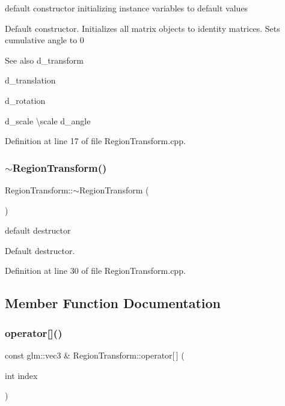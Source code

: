 default constructor initializing instance variables to default values 

Default constructor. Initializes all matrix objects to identity matrices. Sets cumulative angle to 0

\begin{DoxySeeAlso}{See also}
d\+\_\+transform 

d\+\_\+translation 

d\+\_\+rotation 

d\+\_\+scale \textbackslash{}scale d\+\_\+angle 
\end{DoxySeeAlso}


Definition at line 17 of file Region\+Transform.\+cpp.

\mbox{\label{class_region_transform_a94c5436c4f558879d920c97eb9e20611}} 
\subsubsection{\texorpdfstring{$\sim$RegionTransform()}{~RegionTransform()}}
{\footnotesize\ttfamily Region\+Transform\+::$\sim$\+Region\+Transform (\begin{DoxyParamCaption}{ }\end{DoxyParamCaption})}



default destructor 

Default destructor. 

Definition at line 30 of file Region\+Transform.\+cpp.



\subsection{Member Function Documentation}
\mbox{\label{class_region_transform_a5ef023995359c8ed01ecfac62a6b1ee4}} 
\subsubsection{\texorpdfstring{operator[]()}{operator[]()}}
{\footnotesize\ttfamily const glm\+::vec3 \& Region\+Transform\+::operator\mbox{[}$\,$\mbox{]} (\begin{DoxyParamCaption}\item[{int}]{index }\end{DoxyParamCaption})}




